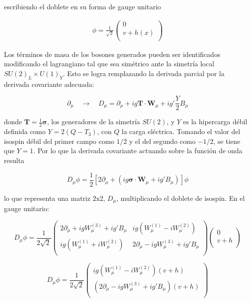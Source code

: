 escribiendo el doblete en su forma de gauge unitario

\begin{align}
    \phi = \frac{1}{\sqrt{2}}\begin{pmatrix}
        0\\
        v+h(x)\\
        \end{pmatrix}
\end{align}

Los términos de masa de los bosones generados pueden ser identificados modificando el lagrangiano tal que sea simétrico ante la simetría local $SU(2)_L\times U(1)_Y$. Esto se logra remplazando la derivada parcial por la derivada covariante adecuada: 

$$ \partial_{\mu} \quad \longrightarrow \quad D_{\mu} = \partial_{\mu} + ig \textbf{T}\cdot \textbf{W}_{\mu} +ig'\frac{Y}{2}B_{\mu} $$

donde $\textbf{T} = \frac{1}{2}\boldsymbol\sigma$, los generadores de la simetría $SU(2)$, y $Y$ es la hipercarga débil definida como $Y = 2(Q - T_3)$, con $Q$ la carga eléctrica. Tomando el valor del isospin débil del primer campo como $1/2$ y el del segundo como $-1/2$, se tiene que $Y=1$. Por lo que la derivada covariante actuando sobre la función de onda resulta

$$ D_{\mu}\phi = \frac{1}{2}\left[2\partial_{\mu} + \left( ig\boldsymbol\sigma \cdot \textbf{W}_{\mu} + ig'B_{\mu} \right) \right]\phi $$

lo que representa una matriz $2\text{x}2$, $D_{\mu}$, multiplicando el doblete de isospin. En el gauge unitario:

$$ D_{\mu}\phi  = \frac{1}{2\sqrt{2}}\begin{pmatrix}
    2\partial_{\mu} + igW_{\mu}^{(3)}+ig'B_{\mu} & ig(W_{\mu}^{(1)} -iW_{\mu}^{(2)}) \\
    ig(W_{\mu}^{(1)} +iW_{\mu}^{(2)}) & 2\partial_{\mu} - igW_{\mu}^{(3)}+ig'B_{\mu}\\
\end{pmatrix}
    \begin{pmatrix}
        0 \\
        v+h\\
    \end{pmatrix}$$

$$ D_{\mu}\phi = \frac{1}{2\sqrt{2}}\begin{pmatrix}
    ig(W_{\mu}^{(1)} -iW_{\mu}^{(2)})(v+h)\\
    (2\partial_{\mu} - igW_{\mu}^{(3)}+ig'B_{\mu})(v+h) \\
\end{pmatrix} $$

